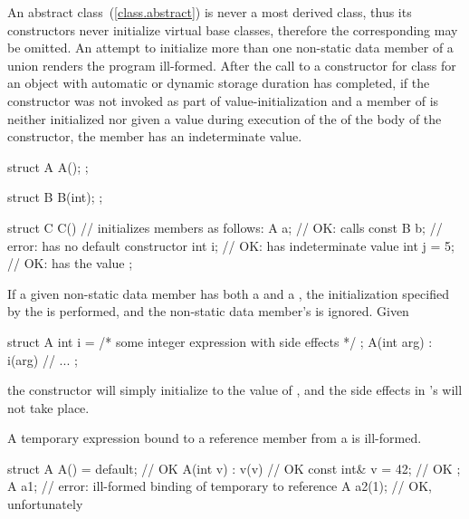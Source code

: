 \enternote An abstract class~(\ref{class.abstract}) is never a most derived
class, thus its constructors never initialize virtual base classes, therefore the
corresponding  may be omitted. \exitnote
An attempt to initialize more than one non-static data member of a union renders the
program ill-formed.
%
%
\enternote
After the call to a constructor for class
for an object with automatic or dynamic storage duration
has completed, if
the constructor was not invoked as part of value-initialization and
a member of
is neither initialized nor
given a value
during execution of the  of the body of the constructor,
the member has an indeterminate value.
\exitnote
\enterexample
\begin{codeblock}
struct A {
  A();
};

struct B {
  B(int);
};

struct C {
  C() { }               // initializes members as follows:
  A a;                    // OK: calls 
  const B b;              // error:  has no default constructor
  int i;                  // OK:  has indeterminate value
  int j = 5;              // OK:  has the value 
};
\end{codeblock}
\exitexample

\pnum
If a given non-static data member has both a 
and a , the initialization specified by the
 is performed, and the non-static data member's 
 is ignored.
\enterexample Given
\begin{codeblock}
struct A {
  int i = /* some integer expression with side effects */ ;
  A(int arg) : i(arg) { }
  // ...
};
\end{codeblock}

the  constructor will simply initialize  to the value of
, and the
%
side effects in 's 
will not take place.
\exitexample

\pnum
A temporary expression bound to a reference member from a
 is ill-formed.
\enterexample
\begin{codeblock}
struct A {
  A() = default;          // OK
  A(int v) : v(v) { }     // OK
  const int& v = 42;      // OK
};
A a1;                     // error: ill-formed binding of temporary to reference
A a2(1);                  // OK, unfortunately
\end{codeblock}
\exitexample


